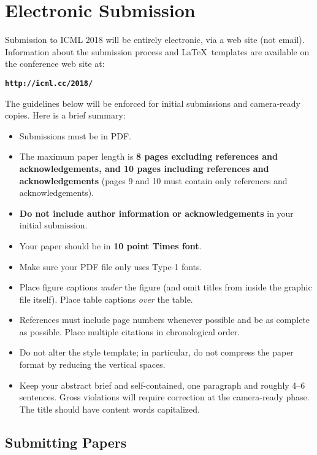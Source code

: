 \documentclass{article}
\begin{document}
\section{Electronic Submission}
\label{submission}

Submission to ICML 2018 will be entirely electronic, via a web site
(not email). Information about the submission process and \LaTeX\ templates
are available on the conference web site at:
\begin{center}
\textbf{\texttt{http://icml.cc/2018/}}
\end{center}

The guidelines below will be enforced for initial submissions and
camera-ready copies. Here is a brief summary:
\begin{itemize}
\item Submissions must be in PDF\@.
\item The maximum paper length is \textbf{8 pages excluding references and
    acknowledgements, and 10 pages including references and acknowledgements}
    (pages 9 and 10 must contain only references and acknowledgements).
\item \textbf{Do not include author information or acknowledgements} in your
    initial submission.
\item Your paper should be in \textbf{10 point Times font}.
\item Make sure your PDF file only uses Type-1 fonts.
\item Place figure captions \emph{under} the figure (and omit titles from inside
    the graphic file itself). Place table captions \emph{over} the table.
\item References must include page numbers whenever possible and be as complete
    as possible. Place multiple citations in chronological order.
\item Do not alter the style template; in particular, do not compress the paper
    format by reducing the vertical spaces.
\item Keep your abstract brief and self-contained, one paragraph and roughly
    4--6 sentences. Gross violations will require correction at the
    camera-ready phase. The title should have content words capitalized.
\end{itemize}

\subsection{Submitting Papers}
\end{document}

